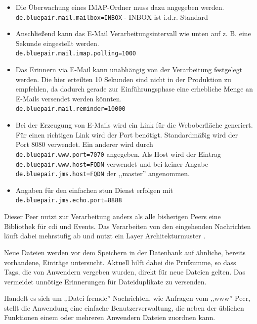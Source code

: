 \documentclass[oneside, ngerman, toc=bibliography,bibliography=totoc,listof=entryprefix, open=right,numbers=noenddot,fontsize=12pt]{scrbook}
\begin{document}
\begin{itemize}
    \item Die Überwachung eines IMAP-Ordner muss dazu angegeben werden.\\
    \verb|de.bluepair.mail.mailbox=INBOX| - INBOX ist i.d.r. Standard
    \item Anschließend kann das E-Mail Verarbeitungsintervall wie unten auf z. B. eine Sekunde eingestellt werden.\\
    \verb|de.bluepair.mail.imap.polling=1000|
    \item Das Erinnern via E-Mail kann unabhängig von der Verarbeitung festgelegt werden. Die hier erteilten 10 Sekunden sind nicht in der Produktion zu empfehlen, da dadurch gerade zur Einführungsphase eine erhebliche Menge an E-Mails versendet werden könnten.\\
    \verb|de.bluepair.mail.reminder=10000|
    \item Bei der Erzeugung von E-Mails wird ein Link für die Weboberfläche generiert. Für einen richtigen Link wird der Port benötigt. Standardmäßig wird der Port 8080 verwendet. Ein anderer wird durch \\
    \verb|de.bluepair.www.port=7070| angegeben. Als Host wird der Eintrag \\
    \verb|de.bluepair.www.host=FQDN| verwendet und bei keiner Angabe \\
     \verb|de.bluepair.jms.host=FQDN| der ,,master'' angenommen.
    
    \item Angaben für den einfachen \acrshort{stun} Dienst erfolgen mit \\
    \verb|de.bluepair.jms.echo.port=8888|
    
\end{itemize}
 
Dieser Peer nutzt zur Verarbeitung anders als alle bisherigen Peers eine Bibliothek für \acrshort{cdi} und Events. 
Das Verarbeiten von den eingehenden Nachrichten läuft dabei mehrstufig ab und nutzt ein Layer Architekturmuster \cite{buschmann1998pattern}.

Neue Dateien werden vor dem Speichern in der Datenbank auf ähnliche, bereits vorhandene, Einträge untersucht.
Aktuell hilft dabei die Prüfsumme, so dass Tags, die von Anwendern vergeben wurden, direkt für neue Dateien gelten. Das vermeidet unnötige Erinnerungen für Dateiduplikate  zu versenden.

Handelt es sich um ,,Datei fremde'' Nachrichten, wie Anfragen vom ,,www''-Peer, stellt die Anwendung eine einfache Benutzerverwaltung, die neben der üblichen Funktionen  einem oder mehreren Anwendern Dateien zuordnen kann.
\end{document}
